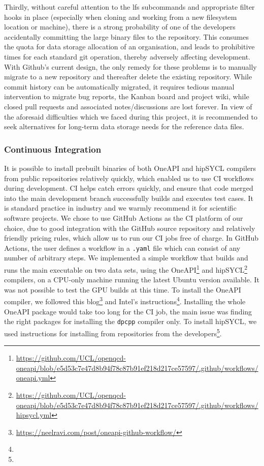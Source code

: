 \documentclass[../main]{subfiles}
\begin{document}
Thirdly, without careful attention to the lfs subcommands and appropriate filter hooks in place (especially when cloning and working from a new filesystem location or machine), there is a strong probability of one of the developers accidentally committing the large binary files to the repository.
This consumes the quota for data storage allocation of an organisation, and leads to prohibitive times for each standard git operation, thereby adversely affecting development.
With Github's current design, the only remedy for these problems is to manually migrate to a new repository and thereafter delete the existing repository.
While commit history can be automatically migrated, it requires tedious manual intervention to migrate bug reports, the Kanban board and project wiki, while closed pull requests and associated notes/discussions are lost forever.
In view of the aforesaid difficulties which we faced during this project, it is recommended to seek alternatives for long-term data storage needs for the reference data files.

\subsubsection{Continuous Integration}

It is possible to install prebuilt binaries of both OneAPI and hipSYCL compilers from public repositories relatively quickly, which enabled us to use CI workflows during development.
CI helps catch errors quickly, and ensure that code merged into the main development branch successfully builds and executes test cases.
It is standard practice in industry and we warmly recommend it for scientific software projects.
We chose to use GitHub Actions as the CI platform of our choice, due to good integration with the GitHub source repository and relatively friendly pricing rules, which allow us to run our CI jobs free of charge.
In GitHub Actions, the user defines a workflow in a \verb #.yaml# file which can consist of any number of arbitrary steps.
We implemented a simple workflow that builds and runs the main executable on two data sets, using the OneAPI\footnote{\url{https://github.com/UCL/openqcd-oneapi/blob/e5d53c7e47d8b94f78c87b91ef218d217ce57597/.github/workflows/oneapi.yml}} and hipSYCL\footnote{\url{https://github.com/UCL/openqcd-oneapi/blob/e5d53c7e47d8b94f78c87b91ef218d217ce57597/.github/workflows/hipsycl.yml}} compilers, on a CPU-only machine running the latest Ubuntu version available.
It was not possible to test the GPU builds at this time.
To install the OneAPI compiler, we followed this blog\footnote{\url{https://neelravi.com/post/oneapi-github-workflow/}} and Intel's instructions\footnote{\oneapiaptinstall}.
Installing the whole OneAPI package would take too long for the CI job, the main issue was finding the right packages for installing the \verb #dpcpp# compiler only.
To install hipSYCL, we used instructions for installing from repositories from the developers\footnote{\hipsyclinstallfromrepos}.
\end{document}
